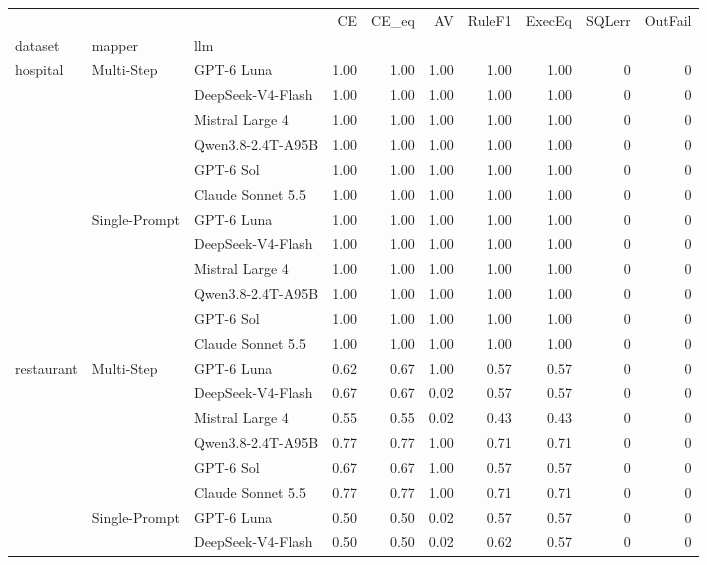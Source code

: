 \begin{tabular}{lllrrrrrrr}
\toprule
 &  &  & CE & CE_eq & AV & RuleF1 & ExecEq & SQLerr & OutFail \\
dataset & mapper & llm &  &  &  &  &  &  &  \\
\midrule
\multirow[t]{12}{*}{hospital} & \multirow[t]{6}{*}{Multi-Step} & GPT-6 Luna & 1.00 & 1.00 & 1.00 & 1.00 & 1.00 & 0 & 0 \\
 &  & DeepSeek-V4-Flash & 1.00 & 1.00 & 1.00 & 1.00 & 1.00 & 0 & 0 \\
 &  & Mistral Large 4 & 1.00 & 1.00 & 1.00 & 1.00 & 1.00 & 0 & 0 \\
 &  & Qwen3.8-2.4T-A95B & 1.00 & 1.00 & 1.00 & 1.00 & 1.00 & 0 & 0 \\
 &  & GPT-6 Sol & 1.00 & 1.00 & 1.00 & 1.00 & 1.00 & 0 & 0 \\
 &  & Claude Sonnet 5.5 & 1.00 & 1.00 & 1.00 & 1.00 & 1.00 & 0 & 0 \\
\cline{2-10}
 & \multirow[t]{6}{*}{Single-Prompt} & GPT-6 Luna & 1.00 & 1.00 & 1.00 & 1.00 & 1.00 & 0 & 0 \\
 &  & DeepSeek-V4-Flash & 1.00 & 1.00 & 1.00 & 1.00 & 1.00 & 0 & 0 \\
 &  & Mistral Large 4 & 1.00 & 1.00 & 1.00 & 1.00 & 1.00 & 0 & 0 \\
 &  & Qwen3.8-2.4T-A95B & 1.00 & 1.00 & 1.00 & 1.00 & 1.00 & 0 & 0 \\
 &  & GPT-6 Sol & 1.00 & 1.00 & 1.00 & 1.00 & 1.00 & 0 & 0 \\
 &  & Claude Sonnet 5.5 & 1.00 & 1.00 & 1.00 & 1.00 & 1.00 & 0 & 0 \\
\cline{1-10} \cline{2-10}
\multirow[t]{12}{*}{restaurant} & \multirow[t]{6}{*}{Multi-Step} & GPT-6 Luna & 0.62 & 0.67 & 1.00 & 0.57 & 0.57 & 0 & 0 \\
 &  & DeepSeek-V4-Flash & 0.67 & 0.67 & 0.02 & 0.57 & 0.57 & 0 & 0 \\
 &  & Mistral Large 4 & 0.55 & 0.55 & 0.02 & 0.43 & 0.43 & 0 & 0 \\
 &  & Qwen3.8-2.4T-A95B & 0.77 & 0.77 & 1.00 & 0.71 & 0.71 & 0 & 0 \\
 &  & GPT-6 Sol & 0.67 & 0.67 & 1.00 & 0.57 & 0.57 & 0 & 0 \\
 &  & Claude Sonnet 5.5 & 0.77 & 0.77 & 1.00 & 0.71 & 0.71 & 0 & 0 \\
\cline{2-10}
 & \multirow[t]{6}{*}{Single-Prompt} & GPT-6 Luna & 0.50 & 0.50 & 0.02 & 0.57 & 0.57 & 0 & 0 \\
 &  & DeepSeek-V4-Flash & 0.50 & 0.50 & 0.02 & 0.62 & 0.57 & 0 & 0 \\

\end{tabular}
